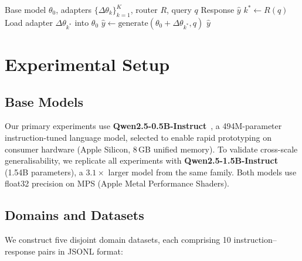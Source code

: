 \documentclass[conference, 10pt]{IEEEtran}
\begin{document}
\begin{algorithm}[t]
\caption{Gossip Handshake Protocol}
\label{alg:gossip}
\begin{algorithmic}[1]
\Require Base model $\theta_0$, adapters $\{\Delta\theta_k\}_{k=1}^K$,
         router $R$, query $q$
\Ensure Response $\hat{y}$
\State $k^* \gets R(q)$
\State Load adapter $\Delta\theta_{k^*}$ into $\theta_0$
\State $\hat{y} \gets \text{generate}(\theta_0 + \Delta\theta_{k^*}, q)$
\State \Return $\hat{y}$
\end{algorithmic}
\end{algorithm}

\section{Experimental Setup}
\label{sec:setup}

\subsection{Base Models}
Our primary experiments use \textbf{Qwen2.5-0.5B-Instruct}~\cite{qwen2024},
a 494M-parameter instruction-tuned language model, selected to enable rapid
prototyping on consumer hardware (Apple Silicon, 8\,GB unified memory).
To validate cross-scale generalisability, we replicate all experiments with
\textbf{Qwen2.5-1.5B-Instruct} (1.54B parameters), a $3.1\times$ larger
model from the same family.
Both models use float32 precision on MPS (Apple Metal Performance Shaders).

\subsection{Domains and Datasets}
\label{sec:datasets}

We construct five disjoint domain datasets, each comprising 10
instruction--response pairs in JSONL format:
\end{document}
